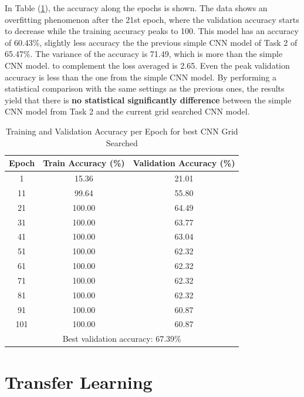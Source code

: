 \documentclass[11pt]{scrartcl}
\begin{document}
In Table (\ref{tab:task2-bonus-accuracy}), the accuracy along the epochs is shown.
The data shows an overfitting phenomenon after the 21st epoch,
where the validation accuracy starts to decrease while the training accuracy peaks to 100.
This model has an accuracy of 60.43\%, 
slightly less accuracy the the previous simple CNN model of Task 2 of 65.47\%.
The variance of the accuracy is 71.49, 
which is more than the simple CNN model.
to complement the loss averaged is 2.65.
Even the peak validation accuracy is less than the one from the simple CNN model.
By performing a statistical comparison with the same settings as the previous ones,
the results yield that there is \textbf{no statistical significantly difference}
between the simple CNN model from Task 2 and the current grid searched CNN model.

\begin{table}[htbp]
\centering
\caption{Training and Validation Accuracy per Epoch for best CNN Grid Searched}
\begin{tabular}{ccc}
\toprule
\textbf{Epoch} & \textbf{Train Accuracy (\%)} & \textbf{Validation Accuracy (\%)} \\
\midrule
1    & 15.36  & 21.01  \\
11   & 99.64  & 55.80  \\
21   & 100.00 & 64.49  \\
31   & 100.00 & 63.77  \\
41   & 100.00 & 63.04  \\
51   & 100.00 & 62.32  \\
61   & 100.00 & 62.32  \\
71   & 100.00 & 62.32  \\
81   & 100.00 & 62.32  \\
91   & 100.00 & 60.87  \\
101  & 100.00 & 60.87  \\
\midrule
\multicolumn{3}{c}{Best validation accuracy: 67.39\%} \\
\bottomrule
\end{tabular}
\label{tab:task2-bonus-accuracy}
\end{table}


\clearpage
\section{Transfer Learning}
\end{document}
